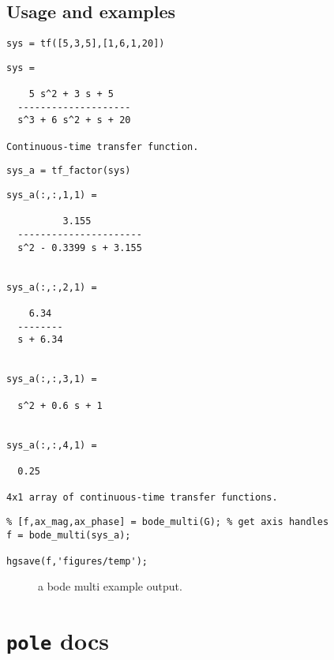 \hypertarget{usage-and-examples-1}{%
\subsection{Usage and examples}\label{usage-and-examples-1}}

\begin{verbatim}
sys = tf([5,3,5],[1,6,1,20])
\end{verbatim}

\begin{verbatim}
sys =
 
    5 s^2 + 3 s + 5
  --------------------
  s^3 + 6 s^2 + s + 20
 
Continuous-time transfer function.
\end{verbatim}

\begin{verbatim}
sys_a = tf_factor(sys)
\end{verbatim}

\begin{verbatim}
sys_a(:,:,1,1) =
 
          3.155
  ----------------------
  s^2 - 0.3399 s + 3.155
 

sys_a(:,:,2,1) =
 
    6.34
  --------
  s + 6.34
 

sys_a(:,:,3,1) =
 
  s^2 + 0.6 s + 1
 

sys_a(:,:,4,1) =
 
  0.25
 
4x1 array of continuous-time transfer functions.
\end{verbatim}

\begin{verbatim}
% [f,ax_mag,ax_phase] = bode_multi(G); % get axis handles
f = bode_multi(sys_a);

hgsave(f,'figures/temp');
\end{verbatim}

\begin{figure}
\centering

\caption{a bode multi example output.}
\label{fig:bode_multi_docs}
\end{figure}

\hypertarget{pole-docs}{%
\section{\texorpdfstring{\texttt{pole}
docs}{ docs}}\label{pole-docs}}

